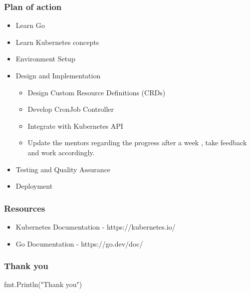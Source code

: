 \documentclass{beamer}
\begin{document}
\begin{frame}
    \frametitle{Plan of action}

    \begin{itemize}
        \item Learn Go
        \item Learn Kubernetes concepts 
        \item Environment Setup
        \item Design and Implementation 
        \begin{itemize}
            \item Design Custom Resource Definitions (CRDs)
            \item Develop CronJob Controller
            \item Integrate with Kubernetes API 
            \item Update the mentors regarding the progress after a week , take feedback and work accordingly.
        \end{itemize}
        \item Testing and Quality Assurance
        \item Deployment 
    \end{itemize}
\end{frame}
\begin{frame}
    \frametitle{Resources}

    \begin{itemize}
        \item Kubernetes Documentation - https://kubernetes.io/
        \item  Go Documentation - https://go.dev/doc/
        
    \end{itemize}
\end{frame}
\begin{frame}
    \frametitle{Thank you}
    fmt.Println("Thank you")
\end{frame}
    
\end{document}
